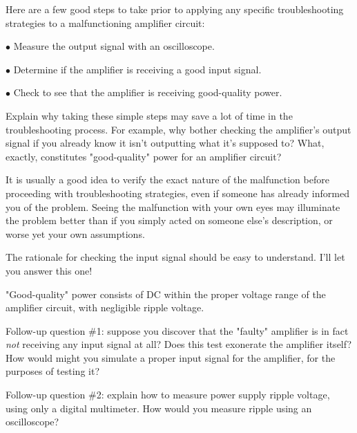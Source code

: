 

Here are a few good steps to take prior to applying any specific troubleshooting strategies to a malfunctioning amplifier circuit:

\medskip
\item{$\bullet$} Measure the output signal with an oscilloscope.
\item{$\bullet$} Determine if the amplifier is receiving a good input signal.
\item{$\bullet$} Check to see that the amplifier is receiving good-quality power.
\medskip

Explain why taking these simple steps may save a lot of time in the troubleshooting process.  For example, why bother checking the amplifier's output signal if you already know it isn't outputting what it's supposed to?  What, exactly, constitutes "good-quality" power for an amplifier circuit?







It is usually a good idea to verify the exact nature of the malfunction before proceeding with troubleshooting strategies, even if someone has already informed you of the problem.  Seeing the malfunction with your own eyes may illuminate the problem better than if you simply acted on someone else's description, or worse yet your own assumptions.

The rationale for checking the input signal should be easy to understand.  I'll let you answer this one!

"Good-quality" power consists of DC within the proper voltage range of the amplifier circuit, with negligible ripple voltage.

\vskip 10pt

Follow-up question \#1: suppose you discover that the "faulty" amplifier is in fact {\it not} receiving any input signal at all?  Does this test exonerate the amplifier itself?  How would might you simulate a proper input signal for the amplifier, for the purposes of testing it?

\vskip 10pt

Follow-up question \#2: explain how to measure power supply ripple voltage, using only a digital multimeter.  How would you measure ripple using an oscilloscope?

